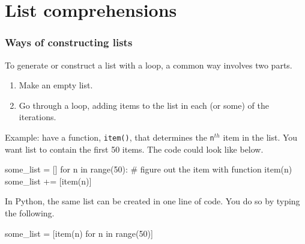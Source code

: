 \documentclass{beamer}
\newenvironment{codeblock}
    {\hfill\begin{beamerboxesrounded}[lower=codecol, width=0.8\textwidth]
    \medskip

    }
    { 
    \end{beamerboxesrounded}\hfill
    }
\theoremstyle{example}
\newcommand{\ttt}[1]{{\small\texttt{#1}}}
\begin{document}
\section{List comprehensions}
\begin{frame}[fragile]
\frametitle{Ways of constructing lists}

To generate or construct a list with a loop, a common way involves two parts.
\begin{enumerate}
	\item Make an empty list.
	\item Go through a loop, adding items to the list in each (or some) of the iterations.
\end{enumerate}

Example: have a function, \ttt{item()}, that determines the \ttt{n}$^{th}$ item in the list. You want list to contain the first 50 items. The code could look like below. 

\begin{codeblock}

\begin{python}
some_list = []
for n in range(50):
    # figure out the item with function item(n)
    some_list += [item(n)]
\end{python}

\end{codeblock}

In Python, the same list can be created in one line of code. You do so by typing the following.

\begin{codeblock}

\begin{python}[numbers=none]
some_list = [item(n) for n in range(50)]
\end{python}

\end{codeblock}

\end{frame}
\end{document}
